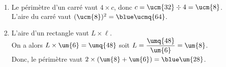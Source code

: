 \begin{colonne*exercice}
\begin{corrige}
   \ \\ [-5mm]
   \begin{enumerate}
      \item Le périmètre d'un carré vaut $4\times c$, donc $c =\ucm{32}\div4 =\ucm{8}$. \\
         L'aire du carré vaut $(\ucm{8})^2 =\blue\ucmq{64}$.
      \item L'aire d'un rectangle vaut $L\times\ell$. \\
         On a alors $L\times\um{6} =\umq{48}$ soit $L =\dfrac{\umq{48}}{\um{6}} =\um{8}$. \\ [1mm]
         Donc, le périmètre vaut $2\times(\um{8}+\um{6}) =\blue\um{28}$.
   \end{enumerate}
\end{corrige}



\end{colonne*exercice}
